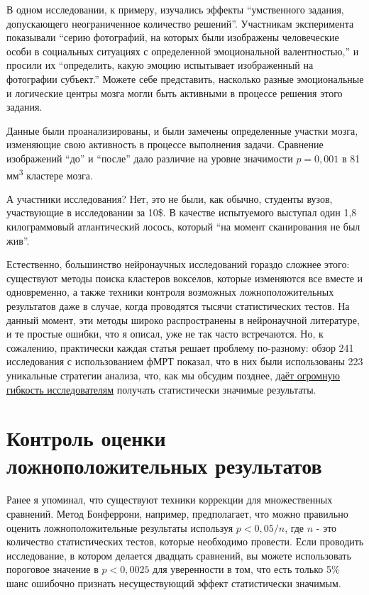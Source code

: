 В одном исследовании, к примеру, изучались эффекты ``умственного задания, допускающего неограниченное количество решений''. Участникам эксперимента показывали ``серию фотографий, на которых были изображены человеческие особи в социальных ситуациях с определенной эмоциональной валентностью,'' и просили их ``определить, какую эмоцию испытывает изображенный на фотографии субъект.'' Можете себе представить, насколько разные эмоциональные и логические центры мозга могли быть активными в процессе решения этого задания.   

Данные были проанализированы, и были замечены определенные участки мозга, изменяющие свою активность в процессе выполнения задачи. Сравнение изображений ``до'' и ``после'' дало различие на уровне значимости $p = 0, 001$ в 81 мм\textsuperscript{3} кластере мозга.

А участники исследования? Нет, это не были, как обычно, студенты вузов, участвующие в исследовании за 10\$. В качестве испытуемого выступал один 1,8 килограммовый атлантический лосось, который ``на момент сканирования не был жив''.\cite{bennett_neural_2009}  

Естественно, большинство нейронаучных исследований гораздо сложнее этого: существуют методы поиска кластеров вокселов, которые изменяются все вместе и одновременно, а также техники контроля возможных ложноположительных результатов даже в случае, когда проводятся тысячи статистических тестов. На данный момент, эти методы широко распространены в нейронаучной литературе, и те простые ошибки, что я описал, уже не так часто встречаются. Но, к сожалению, практически каждая статья решает проблему по-разному: обзор 241 исследования с использованием фМРТ показал, что в них были использованы 223 уникальные стратегии анализа, что, как мы обсудим позднее, \hyperref[chp8]{даёт огромную гибкость исследователям} получать статистически значимые результаты.\cite{carp_secret_2012}  


\section{Контроль оценки ложноположительных результатов}
\label{chp5:controlfalserate}

Ранее я упоминал, что существуют техники коррекции для множественных сравнений. Метод Бонферрони, например, предполагает, что можно правильно оценить ложноположительные результаты используя $p < 0,05/ n$, где $n$ - это количество статистических тестов, которые необходимо провести. Если проводить исследование, в котором делается двадцать сравнений, вы можете использовать пороговое значение в $p < 0,0025$ для уверенности в том, что есть только 5\% шанс ошибочно признать несуществующий эффект статистически значимым.

